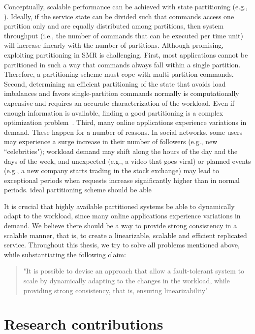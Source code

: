 Conceptually, scalable performance can be achieved with state partitioning
(e.g., \cite{facebookTAO, sciascia2012sdur, Aguilera:2007}). Ideally, if the
service state can be divided such that commands access one partition only and
are equally distributed among partitions, then system throughput (i.e., the
number of commands that can be executed per time unit) will increase linearly
with the number of partitions. Although promising, exploiting partitioning in
SMR is challenging.
First, most applications cannot be partitioned in such a way that commands
always fall within a single partition. Therefore, a partitioning scheme must
cope with multi-partition commands.
Second, determining an efficient partitioning of the state that avoids load
imbalances and favors single-partition commands normally is computationally
expensive and requires an accurate characterization of the workload. Even if
enough information is available, finding a good partitioning is a complex
optimization problem~\cite{curino2010sch,taft2014est}.
Third, many online applications experience variations in demand. These happen
for a number of reasons. In social networks, some users may experience a surge
increase in their number of followers (e.g., new ``celebrities"); workload
demand may shift along the hours of the day and the days of the week, and
unexpected (e.g., a video that goes viral) or planned events (e.g., a new
company starts trading in the stock exchange) may lead to exceptional periods
when requests increase significantly higher than in normal periods. %
ideal partitioning scheme should be able

It is crucial that highly available partitioned systems be able to dynamically
adapt to the workload, since many online applications experience variations in
demand. We believe there should be a way to provide strong consistency in a
scalable manner, that is, to create a linearizable, scalable and efficient
replicated service. Throughout this thesis, we try to solve all problems
mentioned above, while substantiating the following claim:

\begin{quote}
"It is possible to devise an approach that allow a fault-tolerant system to
scale by dynamically adapting to the changes in the workload, while providing
strong consistency, that is, ensuring linearizability"
\end{quote}


\section{Research contributions}
\label{sec:contribution}


